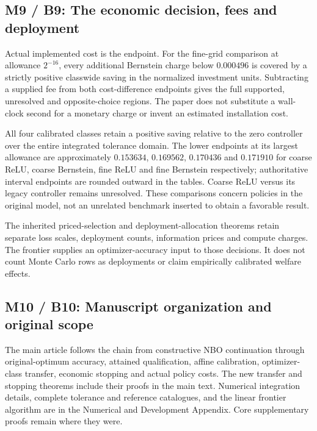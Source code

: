 \hypertarget{m9-b9-the-economic-decision-fees-and-deployment}{%
\subsection{M9 / B9: The economic decision, fees and
deployment}\label{m9-b9-the-economic-decision-fees-and-deployment}}

Actual implemented cost is the endpoint. For the fine-grid comparison at
allowance \(2^{-16}\), every additional Bernstein charge below
\(0.000496\) is covered by a strictly positive classwide saving in the
normalized investment units. Subtracting a supplied fee from both
cost-difference endpoints gives the full supported, unresolved and
opposite-choice regions. The paper does not substitute a wall-clock
second for a monetary charge or invent an estimated installation cost.

All four calibrated classes retain a positive saving relative to the
zero controller over the entire integrated tolerance domain. The lower
endpoints at its largest allowance are approximately \(0.153634\),
\(0.169562\), \(0.170436\) and \(0.171910\) for coarse ReLU, coarse
Bernstein, fine ReLU and fine Bernstein respectively; authoritative
interval endpoints are rounded outward in the tables. Coarse ReLU versus
its legacy controller remains unresolved. These comparisons concern
policies in the original model, not an unrelated benchmark inserted to
obtain a favorable result.

The inherited priced-selection and deployment-allocation theorems retain
separate loss scales, deployment counts, information prices and compute
charges. The frontier supplies an optimizer-accuracy input to those
decisions. It does not count Monte Carlo rows as deployments or claim
empirically calibrated welfare effects.

\hypertarget{m10-b10-manuscript-organization-and-original-scope}{%
\subsection{M10 / B10: Manuscript organization and original
scope}\label{m10-b10-manuscript-organization-and-original-scope}}

The main article follows the chain from constructive NBO continuation
through original-optimum accuracy, attained qualification, affine
calibration, optimizer-class transfer, economic stopping and actual
policy costs. The new transfer and stopping theorems include their
proofs in the main text. Numerical integration details, complete
tolerance and reference catalogues, and the linear frontier algorithm
are in the Numerical and Development Appendix. Core supplementary proofs
remain where they were.

